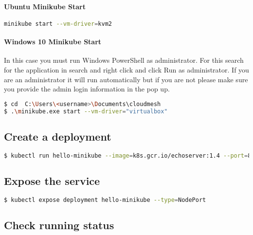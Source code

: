 \paragraph{Ubuntu Minikube Start}\label{ubuntu-minikube-start}

\begin{lstlisting}[language=bash]
minikube start --vm-driver=kvm2
\end{lstlisting}

\paragraph{Windows 10 Minikube Start}\label{windows-10-minikube-start}

In this case you must run Windows PowerShell as administrator. For
this search for the application in search and right click and click Run
as administrator. If you are an administrator it will run automatically
but if you are not please make sure you provide the admin login
information in the pop up.

\begin{lstlisting}[language=bash]
$ cd  C:\Users\<username>\Documents\cloudmesh
$ .\minikube.exe start --vm-driver="virtualbox"
\end{lstlisting}

\subsection{Create a deployment}\label{create-a-deployment}

\begin{lstlisting}[language=bash]
$ kubectl run hello-minikube --image=k8s.gcr.io/echoserver:1.4 --port=8080
\end{lstlisting}

\subsection{Expose the service}\label{expose-the-service}

\begin{lstlisting}[language=bash]
$ kubectl expose deployment hello-minikube --type=NodePort
\end{lstlisting}

\subsection{Check running status}\label{check-running-status}

